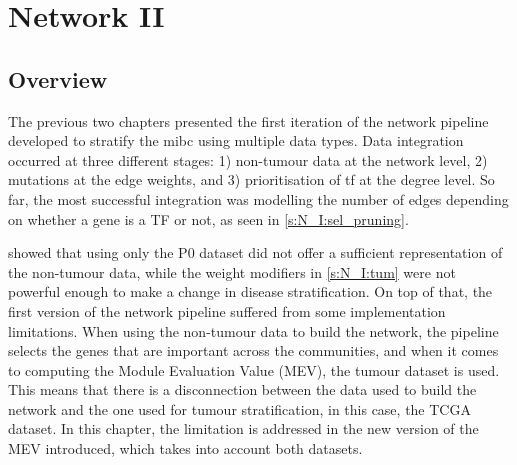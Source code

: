 
\section{Network II} \label{s:N_II}


\vspace{3mm}
\vspace{3mm}


\subsection{Overview}

The previous two chapters presented the first iteration of the network pipeline developed to stratify the \acrfull{mibc} using multiple data types. Data integration occurred at three different stages: 1) non-tumour data at the network level, 2) mutations at the edge weights, and 3) prioritisation of \acrfull{tf} at the degree level. So far, the most successful integration was modelling the number of edges depending on whether a gene is a TF or not, as seen in \cref{s:N_I:sel_pruning}.


 showed that using only the P0 dataset did not offer a sufficient representation of the non-tumour data, while the weight modifiers in \cref{s:N_I:tum} were not powerful enough to make a change in disease stratification. On top of that, the first version of the network pipeline suffered from some implementation limitations. When using the non-tumour data to build the network, the pipeline selects the genes that are important across the communities, and when it comes to computing the Module Evaluation Value (MEV), the tumour dataset is used. This means that there is a disconnection between the data used to build the network and the one used for tumour stratification, in this case, the TCGA dataset. In this chapter, the limitation is addressed in the new version of the MEV introduced, which takes into account both datasets.


